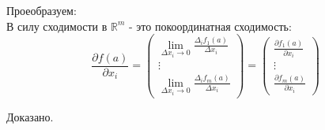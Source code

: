 Проеобразуем: \\
В силу сходимости в  $\mathbb{R}^{m}$ - это покоординатная сходимость: \\
\[\frac{\partial f(a)}{\partial x_{i}}=\left(\begin{array}{c}
\lim _{\Delta x_{i} \rightarrow 0} \frac{\Delta_{i} f_{1}(a)}{\Delta x_{i}} \\
\vdots \\
\lim _{\Delta x_{i} \rightarrow 0} \frac{\Delta_{i} f_{m}(a)}{\Delta x_{i}}
\end{array}\right)=\left(\begin{array}{c}
\frac{\partial f_{1}(a)}{\partial x_{i}} \\
\vdots \\
\frac{\partial f_{m}(a)}{\partial x_{i}}
\end{array}\right)\]

Доказано.
